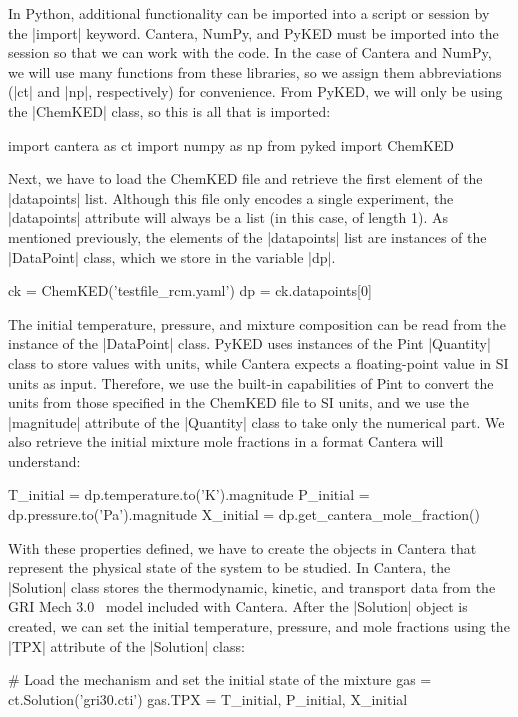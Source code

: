 \documentclass[12pt]{ijck}
\newcommand\ck{ChemKED}
\newcommand\pk{PyKED}
\begin{document}
In Python, additional functionality can be imported into a script or session by the \pybox|import|
keyword. Cantera, NumPy, and PyKED must be imported into the session so that we can work with the
code. In the case of Cantera and NumPy, we will use many functions from these libraries, so we
assign them abbreviations (\pybox|ct| and \pybox|np|, respectively) for convenience. From PyKED, we
will only be using the \pybox|ChemKED| class, so this is all that is imported:
%
\begin{pythonbox}
import cantera as ct
import numpy as np
from pyked import ChemKED
\end{pythonbox}
%
Next, we have to load the ChemKED file and retrieve the first element of the \pybox|datapoints|
list. Although this file only encodes a single experiment, the \pybox|datapoints| attribute will
always be a list (in this case, of length 1). As mentioned previously, the elements of the
\pybox|datapoints| list are instances of the \pybox|DataPoint| class, which we store in the variable
\pybox|dp|.
%
\begin{pythonbox}
ck = ChemKED('testfile_rcm.yaml')
dp = ck.datapoints[0]
\end{pythonbox}
%
The initial temperature, pressure, and mixture composition can be read from the
instance of the \pybox|DataPoint| class. \pk{} uses instances of the Pint \pybox|Quantity| class to
store values with units, while Cantera expects a floating-point value in SI
units as input. Therefore, we use the built-in capabilities of Pint to convert
the units from those specified in the \ck{} file to SI units, and we use the \pybox|magnitude|
attribute of the \pybox|Quantity| class to take only the numerical part. We also retrieve the
initial mixture mole fractions in a format Cantera will understand:
%
\begin{pythonbox}
T_initial = dp.temperature.to('K').magnitude
P_initial = dp.pressure.to('Pa').magnitude
X_initial = dp.get_cantera_mole_fraction()
\end{pythonbox}

With these properties defined, we have to create the objects in Cantera that represent the physical
state of the system to be studied. In Cantera, the \pybox|Solution| class stores the thermodynamic,
kinetic, and transport data from the GRI Mech 3.0~\cite{GRI3.0} model included with Cantera.
After the \pybox|Solution| object is created, we can set the initial temperature, pressure,
and mole fractions using the \pybox|TPX| attribute of the \pybox|Solution| class:
%
\begin{pythonbox}
# Load the mechanism and set the initial state of the mixture
gas = ct.Solution('gri30.cti')
gas.TPX = T_initial, P_initial, X_initial
\end{pythonbox}
\end{document}
